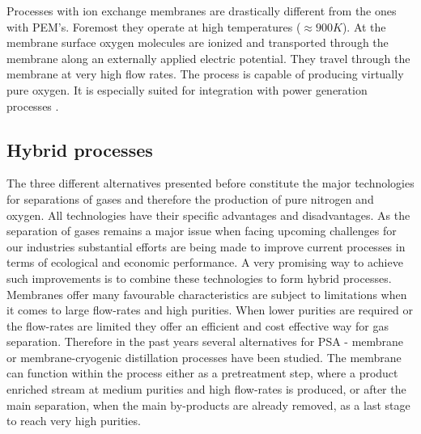         Processes with ion exchange membranes are drastically different from the ones with PEM's. Foremost they
        operate at high temperatures ($\approx 900 K$). At the membrane surface oxygen molecules are ionized
        and transported through the membrane along an externally applied electric potential. They travel
        through the membrane at very high flow rates. The process is capable of producing virtually pure
        oxygen. It is especially suited for integration with power generation processes \cite{Smith.2001}.

        \subsection{Hybrid processes}
        The three different alternatives presented before constitute the major technologies for separations
        of gases and therefore the production of pure nitrogen and oxygen. All technologies have their specific
        advantages and disadvantages. As the separation of gases remains a major issue when facing upcoming challenges
        for our industries substantial efforts are being made to improve current processes in terms of ecological
        and economic performance. A very promising way to achieve such improvements is to combine these technologies
        to form hybrid processes. Membranes offer many favourable characteristics are subject to limitations when
        it comes to large flow-rates and high purities. When lower purities are required or the flow-rates are limited
        they offer an efficient and cost effective way for gas separation. Therefore in the past years several
        alternatives for PSA - membrane \cite{Akinlabi.2007} or membrane-cryogenic distillation processes \cite{Wankat.2011}
        have been studied. The membrane can function within the process either as a pretreatment step, where a product enriched
        stream at medium purities and high flow-rates is produced, or after the main separation, when the main
        by-products are already removed, as a last stage to reach very high purities.

